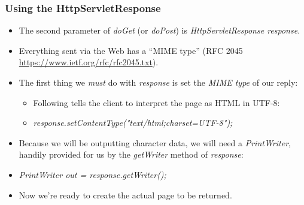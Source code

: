 \documentclass[10pt,xcolor=pdflatex]{beamer}
\begin{document}
\begin{frame}[containsverbatim]\frametitle{Using the \textbf{HttpServletResponse}}
	\begin{itemize}
    	\item The second parameter of \emph{doGet} (or \emph{doPost}) is \emph{HttpServletResponse response}.
		\item Everything sent via the Web has a “MIME type” (RFC 2045 \url{https://www.ietf.org/rfc/rfc2045.txt}).
		\item The first thing we \textit{must} do with \emph{response} is set the \textit{MIME type} of our reply:
          \begin{itemize}
        	\item Following tells the client to interpret the page as HTML in UTF-8:
			\item[] \emph{response.setContentType("text/html;charset=UTF-8");}
          \end{itemize}
        \item Because we will be outputting character data, we will need a \emph{PrintWriter}, handily provided for us by the \emph{getWriter} method of \emph{response}:
        \item[] \emph{PrintWriter out = response.getWriter();}
        \item Now we’re ready to create the actual page to be returned.
    \end{itemize}
\end{frame}
\end{document}
